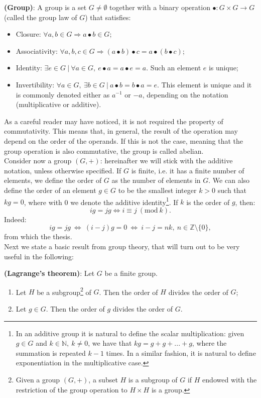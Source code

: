 \begin{mydef} {\bf (Group)}: A group is a set $G \neq \emptyset$ together with a binary operation $\bullet: G \times G \to G$ (called the 	group law of $G$) that satisfies:
	\begin{itemize}
		\item Closure: $\forall a, b \in G  \Longrightarrow a \bullet b \in G$;
		\item Associativity: $\forall a, b, c \in G  \Longrightarrow (a \bullet b) \bullet c = a \bullet (b \bullet c)$;
		\item Identity: $\exists e \in G \ | \ \forall a \in G, \ e \bullet a = a \bullet e = a$. Such an element $e$ is unique; 
		\item Invertibility: $\forall a \in G, \ \exists b \in G \ | \ a \bullet b = b \bullet a = e$. This element is unique and it is commonly denoted either as $a^{-1}$ or $-a$, depending on the notation (multiplicative or additive).
	\end{itemize}
\end{mydef}
\label{def1}
\noindent
As a careful reader may have noticed, it is not required the property of commutativity. This means that, in general, the result of the operation may depend on the order of the operands. If this is not the case, meaning that the group operation is also commutative, the group is called abelian.
\\
Consider now a group $(G, +)$: hereinafter we will stick with the additive notation, unless otherwise specified.
If $G$ is finite, i.e. it has a finite number of elements, we define the order of $G$ as the number of elements in $G$. We can also define the order of an element $g \in G$ to be the smallest integer $k > 0$ such that $kg = 0$, where with 0 we denote the additive identity\footnote{In an additive group it is natural to define the scalar multiplication: given $g \in G$ and $k \in \mathbb{N}, \ k \neq 0$, we have that $kg = g + g + ... + g$, where the summation is repeated $k - 1$ times. In a similar fashion, it is natural to define exponentiation in the multiplicative case.}. If $k$ is the order of $g$, then:
$$ig = jg \Longleftrightarrow i \equiv j \ (\text{mod} \ k).$$
Indeed:
$$ig = jg \ \Longleftrightarrow \ (i - j)g = 0 \ \Longleftrightarrow \ i - j = nk, \ n \in \mathbb{Z}\text{\textbackslash}\{0\},$$
from which the thesis.
\\
Next we state a basic result from group theory, that will turn out to be very useful in the following:
\begin{thm} {\bf (Lagrange's theorem)}:
	Let $G$ be a finite group.
	\begin{enumerate}
		\item Let $H$ be a subgroup\footnote{Given a group $(G, +)$, a subset $H$ is a subgroup of $G$ if $H$ endowed with the restriction of the group operation to $H \times H$ is a group.} of $G$. Then the order of $H$ divides the order of $G$;
		\item Let $g \in G$. Then the order of $g$ divides the order of $G$.
	\end{enumerate}
\end{thm}

